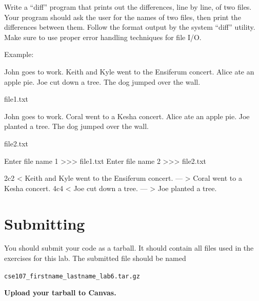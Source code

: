 \documentclass[11pt]{cselabheader}
\begin{document}
  \begin{ex}[diff.py]
    Write a ``diff'' program that prints out the differences, line by line, of
    two files.  Your program should ask the user for the names of two files,
    then print the differences between them.  Follow the format output by the
    system ``diff'' utility.  Make sure to use proper error handling techniques
    for file I/O.

    Example:

\begin{listing}[H]
  \vspace{-0.5em}
    \begin{verbatimcode}
John goes to work.
Keith and Kyle went to the Ensiferum concert.
Alice ate an apple pie.
Joe cut down a tree.
The dog jumped over the wall.
    \end{verbatimcode}
  \vspace{-0.5em}
  \caption{file1.txt}
  \vspace{-0.5em}
\end{listing}

\begin{listing}[H]
  \vspace{-0.5em}
    \begin{verbatimcode}
John goes to work.
Coral went to a Kesha concert.
Alice ate an apple pie.
Joe planted a tree.
The dog jumped over the wall.
    \end{verbatimcode}
  \vspace{-0.5em}
  \caption{file2.txt}
  \vspace{-0.5em}
\end{listing}

    \begin{verbatimcode}
Enter file name 1 >>> file1.txt
Enter file name 2 >>> file2.txt

2c2
< Keith and Kyle went to the Ensiferum concert.
---
> Coral went to a Kesha concert.
4c4
< Joe cut down a tree.
---
> Joe planted a tree.
    \end{verbatimcode}
  \end{ex}


\pagebreak
\section{Submitting}

You should submit your code as a tarball. It should contain all files
used in the exercises for this lab. The submitted file should be named
\begin{center}
  \texttt{cse107\_firstname\_lastname\_lab6.tar.gz}
\end{center}

\begin{center}
  \textbf{Upload your tarball to Canvas.}
\end{center}

\listoftheorems
\end{document}
